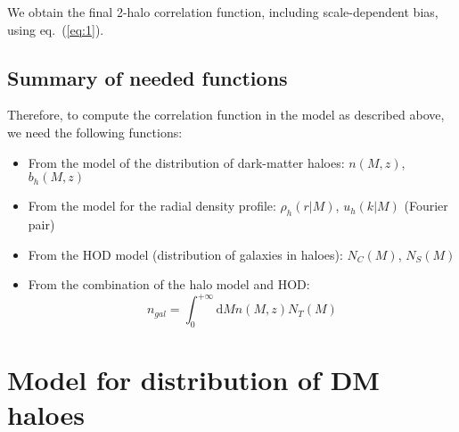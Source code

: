 \documentclass[10pt,a4paper]{article}
\begin{document}
We obtain the final 2-halo correlation function, including scale-dependent bias, using eq.~(\ref{eq:1}).



\subsection{Summary of needed functions}

Therefore, to compute the correlation function in the model as described above, we need the following functions:

\begin{itemize}
\item From the model of the distribution of dark-matter haloes: $n(M,z)$, $b_h(M,z)$
\item From the model for the radial density profile: $\rho_h(r|M)$, $u_h(k|M)$ (Fourier pair)
\item From the HOD model (distribution of galaxies in haloes): $N_C(M)$, $N_S(M)$
\item From the combination of the halo model and HOD:
\begin{equation}
n_{gal} = \int_0^{+\infty} \mathrm{d}M n(M,z) N_T(M)
\end{equation}
\end{itemize}



\section{Model for distribution of DM haloes}
\end{document}
